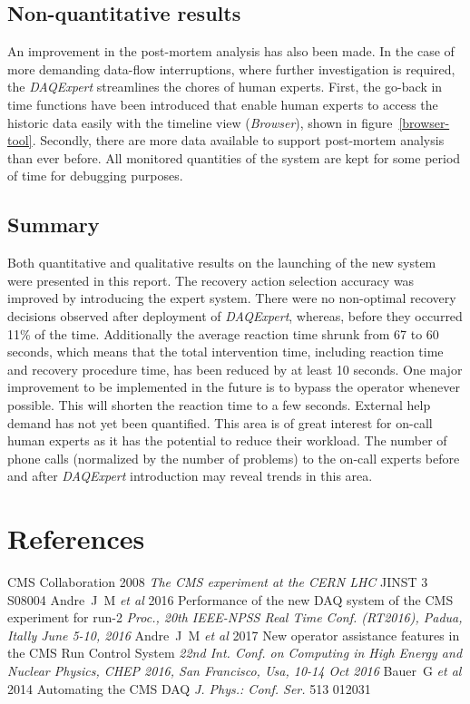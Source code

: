 \documentclass[a4paper]{jpconf}
\begin{document}
\subsection{Non-quantitative results}
An improvement in the post-mortem analysis has also been made. In the case of more demanding data-flow interruptions, where further investigation is required, the{ \it DAQExpert} streamlines the chores of human experts. First, the go-back in time functions have been introduced that enable human experts to access the historic data easily with the timeline view ({\it Browser}), shown in figure~\ref {browser-tool}. Secondly, there are more data available to support post-mortem analysis than ever before. All monitored quantities of the system are kept for some period of time for debugging purposes.

\subsection{Summary}
Both quantitative and qualitative results on the launching of the new system were presented in this report. The recovery action selection accuracy was improved by introducing the expert system. There were no non-optimal recovery decisions observed after deployment of {\it DAQExpert}, whereas, before they occurred 11\% of the time. Additionally the average reaction time shrunk from 67 to 60 seconds, which means that the total intervention time, including reaction time and recovery procedure time, has been reduced by at least 10 seconds. One major improvement to be implemented in the future is to bypass the operator whenever possible. This will shorten the reaction time to a few seconds.
External help demand has not yet been quantified. This area is of great interest for on-call human experts as it has the potential to reduce their workload. The number of phone calls (normalized by the number of problems) to the on-call experts before and after {\it DAQExpert} introduction may reveal trends in this area.


\section*{References}
\begin{thebibliography}{9}

 CMS Collaboration 2008 {\it The CMS experiment at the CERN LHC} JINST 3 S08004
 Andre~J~M {\it et al} 2016 Performance of the new DAQ system of the CMS experiment for run-2 {\it Proc., 20th IEEE-NPSS Real Time Conf. (RT2016), Padua, Itally June 5-10, 2016}
 Andre~J~M {\it et al} 2017 New operator assistance features in the CMS Run Control System {\it 22nd Int. Conf. on Computing in High Energy and Nuclear Physics, CHEP 2016, San Francisco, Usa, 10-14 Oct 2016}
 Bauer~G {\it et al} 2014 Automating the CMS DAQ {\it J. Phys.: Conf. Ser.} 513 012031
\end{thebibliography}
\end{document}
